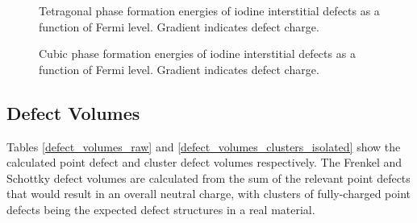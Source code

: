 \begin{figure}[ht]
\begin{center}
		\caption{Tetragonal phase formation energies of iodine interstitial defects as a function of Fermi level. Gradient indicates defect charge.}
		\label{figure:tetinter}
	\end{center}
\end{figure}

\begin{figure}[ht]
\begin{center}
		\caption{Cubic phase formation energies of iodine interstitial defects as a function of Fermi level. Gradient indicates defect charge.}
		\label{figure:cubicinter}
	\end{center}
\end{figure}


\subsection{Defect Volumes}

Tables \ref{defect_volumes_raw} and \ref{defect_volumes_clusters_isolated} show the calculated point defect and cluster defect volumes respectively. The Frenkel and Schottky defect volumes are calculated from the sum of the relevant point defects that would result in an overall neutral charge, with clusters of fully-charged point defects being the expected defect structures in a real material.

